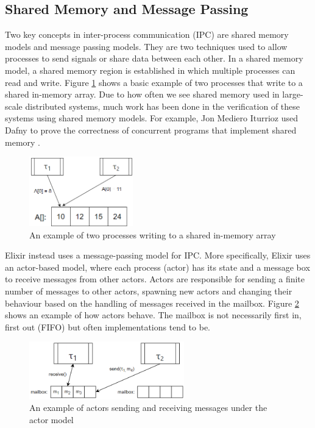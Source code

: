 \subsection[]{Shared Memory and Message Passing}
Two key concepts in inter-process communication (IPC) are shared memory models and message passing models. They are two techniques used to allow processes to send signals or share data between each other. In a shared memory model, a shared memory region is established in which multiple processes can read and write. Figure \ref{fig:shared_memory} shows a basic example of two processes that write to a shared in-memory array. Due to how often we see shared memory used in large-scale distributed systems, much work has been done in the verification of these systems using shared memory models. For example, Jon Mediero Iturrioz used Dafny \cite{dafny} to prove the correctness of concurrent programs that implement shared memory \cite{shared_memory_verification}. 
\begin{figure}[h]
    \centering
    \includegraphics[width=0.4\textwidth]{images/shared_memory.png}
    \caption{An example of two processes writing to a shared in-memory array}
    \label{fig:shared_memory}
\end{figure}
\par
Elixir instead uses a message-passing model for IPC. More specifically, Elixir uses an actor-based model, where each process (actor) has its state and a message box to receive messages from other actors. Actors are responsible for sending a finite number of messages to other actors, spawning new actors and changing their behaviour based on the handling of messages received in the mailbox. Figure \ref{fig:actor_model} shows an example of how actors behave. The mailbox is not necessarily first in, first out (FIFO) but often implementations tend to be.
\begin{figure}[H]
    \centering
    \includegraphics[width=0.6\textwidth]{images/actor_model.png}
    \caption{An example of actors sending and receiving messages under the actor model}
    \label{fig:actor_model}
\end{figure}
